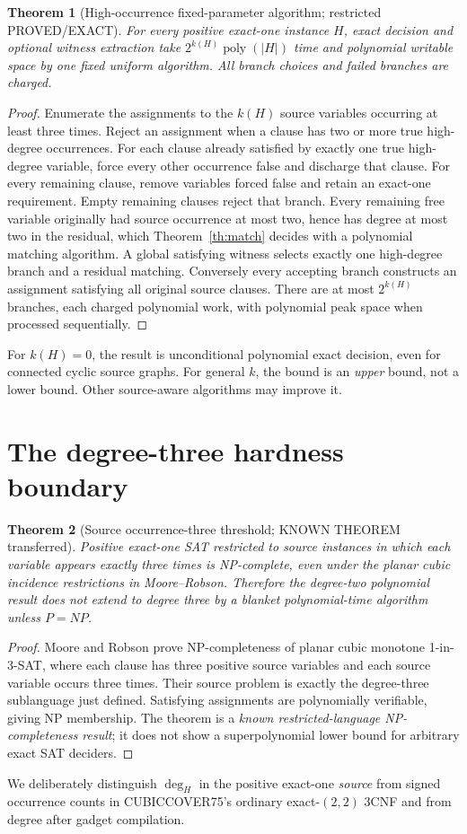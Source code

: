 \documentclass[11pt]{article}
\newtheorem{theorem}{Theorem}
\begin{document}
\begin{theorem}[High-occurrence fixed-parameter algorithm; restricted PROVED/EXACT]\label{th:fpt}
For every positive exact-one instance \(H\), exact decision and optional witness extraction take \(2^{k(H)}\operatorname{poly}(|H|)\) time and polynomial writable space by one fixed uniform algorithm. All branch choices and failed branches are charged.
\end{theorem}
\begin{proof}
Enumerate the assignments to the \(k(H)\) source variables occurring at least three times. Reject an assignment when a clause has two or more true high-degree occurrences. For each clause already satisfied by exactly one true high-degree variable, force every other occurrence false and discharge that clause. For every remaining clause, remove variables forced false and retain an exact-one requirement. Empty remaining clauses reject that branch. Every remaining free variable originally had source occurrence at most two, hence has degree at most two in the residual, which Theorem~\ref{th:match} decides with a polynomial matching algorithm. A global satisfying witness selects exactly one high-degree branch and a residual matching. Conversely every accepting branch constructs an assignment satisfying all original source clauses. There are at most \(2^{k(H)}\) branches, each charged polynomial work, with polynomial peak space when processed sequentially.
\end{proof}
For \(k(H)=0\), the result is unconditional polynomial exact decision, even for connected cyclic source graphs. For general \(k\), the bound is an \emph{upper} bound, not a lower bound. Other source-aware algorithms may improve it.

\section{The degree-three hardness boundary}
\begin{theorem}[Source occurrence-three threshold; KNOWN THEOREM transferred]\label{th:hard}
Positive exact-one SAT restricted to source instances in which each variable appears exactly three times is NP-complete, even under the planar cubic incidence restrictions in Moore--Robson. Therefore the degree-two polynomial result does not extend to degree three by a blanket polynomial-time algorithm unless \(P=NP\).
\end{theorem}
\begin{proof}
Moore and Robson prove NP-completeness of planar cubic monotone 1-in-3-SAT, where each clause has three positive source variables and each source variable occurs three times. Their source problem is exactly the degree-three sublanguage just defined. Satisfying assignments are polynomially verifiable, giving NP membership. The theorem is a \emph{known restricted-language NP-completeness result}; it does not show a superpolynomial lower bound for arbitrary exact SAT deciders.
\end{proof}
\noindent We deliberately distinguish \(\deg_H\) in the positive exact-one \emph{source} from signed occurrence counts in CUBICCOVER75's ordinary exact-\((2,2)\) 3CNF and from degree after gadget compilation.
\end{document}
